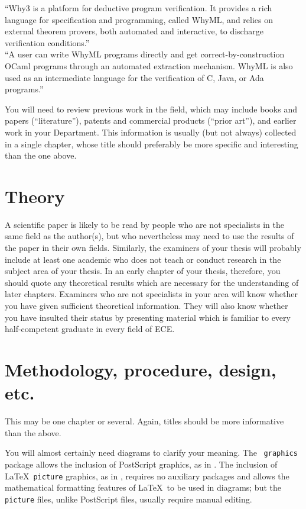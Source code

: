\documentclass[12pt,openany,a4paper]{book}
\begin{document}
``Why3 is a platform for deductive program verification. It provides a rich language for
specification and programming, called WhyML, and relies on external theorem provers,
both automated and interactive, to discharge verification conditions.''\\
``A user can write WhyML programs directly and get correct-by-construction
OCaml programs through an automated extraction mechanism. WhyML is also used as
an intermediate language for the verification of C, Java, or Ada programs.''


You will need to review previous work in the field, which may include
books and papers (``literature''), patents and commercial products
(``prior art''), and earlier work in your Department.  This
information is usually (but not always) collected in a single chapter,
whose title should preferably be more specific and interesting than
the one above.

\chapter{Theory}

A scientific paper is likely to be read by people who are not
specialists in the same field as the author(s), but who nevertheless
may need to use the results of the paper in their own fields.
Similarly, the examiners of your thesis will probably include at least
one academic who does not teach or conduct research in the subject
area of your thesis.  In an early chapter of your thesis, therefore,
you should quote any theoretical results which are necessary for the
understanding of later chapters.  Examiners who are not specialists in
your area will know whether you have given sufficient theoretical
information.  They will also know whether you have insulted their
status by presenting material which is familiar to every
half-competent graduate in every field of ECE.

\chapter{Methodology, procedure, design, etc.}

This may be one chapter or several.  Again, titles should be more
informative than the above.

You will almost certainly need diagrams to clarify your meaning.  The
\LaTeXe\ \texttt{graphics} package allows the inclusion of PostScript
graphics, as in .  The inclusion of \LaTeX\ \texttt{picture}
graphics, as in , requires no auxiliary packages and allows
the mathematical formatting features of \LaTeX\ to be used in
diagrams; but the \texttt{picture} files, unlike PostScript files,
usually require manual editing.
\end{document}
